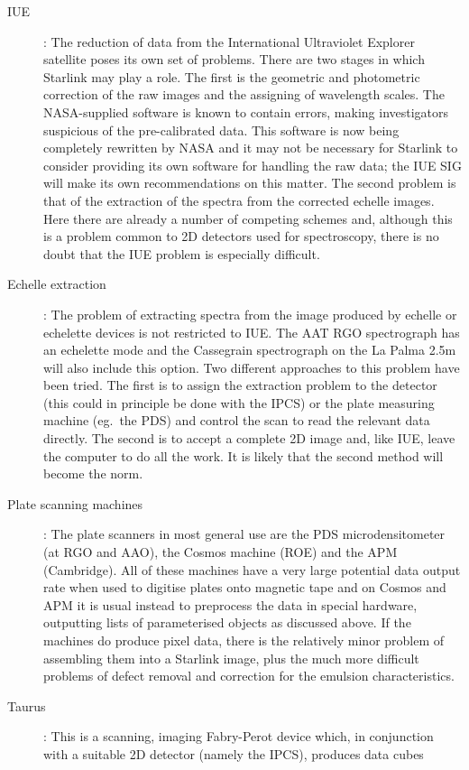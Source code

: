 \begin{description}
\item [IUE]: The reduction of data from the International Ultraviolet Explorer
satellite poses its own set of problems.
There are two stages in which Starlink may play a role.
The first is the geometric and photometric correction of the raw images and the
assigning of wavelength scales.
The NASA-supplied software is known to contain errors, making investigators
suspicious of the pre-calibrated data.
This software is now being completely rewritten by NASA and it may not be
necessary for Starlink to consider providing its own software for handling the
raw data; the IUE SIG will make its own recommendations on this matter.
The second problem is that of the extraction of the spectra from the corrected
echelle images.
Here there are already a number of competing schemes and, although this is a
problem common to 2D detectors used for spectroscopy, there is no doubt that the
IUE problem is especially difficult.
\item [Echelle extraction]: The problem of extracting spectra from the image
produced by echelle or echelette devices is not restricted to IUE.
The AAT RGO spectrograph has an echelette mode and the Cassegrain spectrograph
on the La Palma 2.5m will also include this option.
Two different approaches to this problem have been tried.
The first is to assign the extraction problem to the detector (this could in
principle be done with the IPCS) or the plate measuring machine (eg.\ the PDS)
and control the scan to read the relevant data directly.
The second is to accept a complete 2D image and, like IUE, leave the computer
to do all the work.
It is likely that the second method will become the norm.
\item [Plate scanning machines]: The plate scanners in most general use are the
PDS microdensitometer (at RGO and AAO), the Cosmos machine (ROE) and the APM
(Cambridge).
All of these machines have a very large potential data output rate when used to
digitise plates onto magnetic tape and on Cosmos and APM it is usual instead to
preprocess the data in special hardware, outputting lists of parameterised
objects as discussed above.
If the machines do produce pixel data, there is the relatively minor problem of
assembling them into a Starlink image, plus the much more difficult problems of
defect removal and correction for the emulsion characteristics.
\item [Taurus]: This is a scanning, imaging Fabry-Perot device which, in
conjunction with a suitable 2D detector (namely the IPCS), produces data cubes

\end{description}
